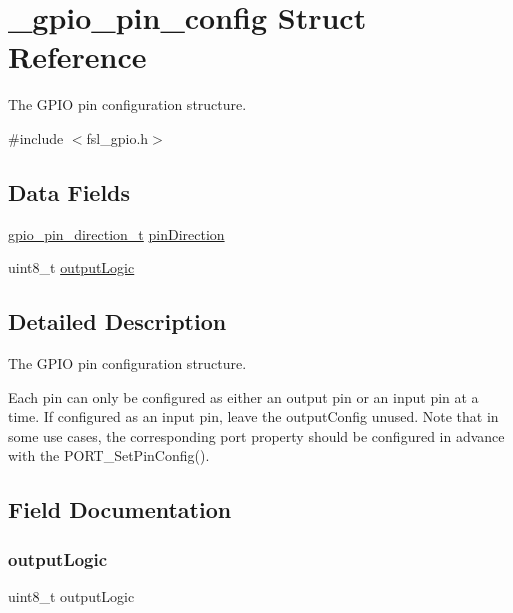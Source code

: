 \hypertarget{struct__gpio__pin__config}{}\section{\+\_\+gpio\+\_\+pin\+\_\+config Struct Reference}
\label{struct__gpio__pin__config}


The G\+P\+IO pin configuration structure.  




{\ttfamily \#include $<$fsl\+\_\+gpio.\+h$>$}

\subsection*{Data Fields}
\begin{DoxyCompactItemize}
\item 
\mbox{\hyperlink{group__gpio_gaf7d75755774a0f20385fbdda546f1f1d}{gpio\+\_\+pin\+\_\+direction\+\_\+t}} \mbox{\hyperlink{struct__gpio__pin__config_ab0b8ce6b7e068de24659c0c382fa481c}{pin\+Direction}}
\item 
uint8\+\_\+t \mbox{\hyperlink{struct__gpio__pin__config_ae25321cd13f1ed5254f722b0f3c64242}{output\+Logic}}
\end{DoxyCompactItemize}


\subsection{Detailed Description}
The G\+P\+IO pin configuration structure. 

Each pin can only be configured as either an output pin or an input pin at a time. If configured as an input pin, leave the output\+Config unused. Note that in some use cases, the corresponding port property should be configured in advance with the P\+O\+R\+T\+\_\+\+Set\+Pin\+Config(). 

\subsection{Field Documentation}
\mbox{\label{struct__gpio__pin__config_ae25321cd13f1ed5254f722b0f3c64242}} 
\subsubsection{\texorpdfstring{outputLogic}{outputLogic}}
{\footnotesize\ttfamily uint8\+\_\+t output\+Logic}


